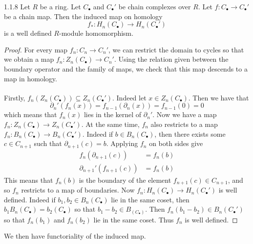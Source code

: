\documentclass[a4paper]{article}
\begin{document}
\begin{lmm}{}{1.1.8} Let $R$ be a ring. Let $C_\bullet$ and $C_\bullet'$ be chain complexes over $R$. Let $f:C_\bullet\to C_\bullet'$ be a chain map. Then the induced map on homology $$f_\ast:H_n(C_\bullet)\to H_n(C_\bullet')$$ is a well defined $R$-module homomorphism. \tcbline
\begin{proof}
For every map $f_n:C_n\to C_n'$, we can restrict the domain to cycles so that we obtain a map $f_n:Z_n(C_\bullet)\to C_n'$. Using the relation given between the boundary operator and the family of maps, we check that this map descends to a map in homology. \\~\\

Firstly, $f_n(Z_n(C_\bullet))\subseteq Z_n(C_\bullet')$. Indeed let $x\in Z_n(C_\bullet)$. Then we have that $$\partial_n'(f_n(x))=f_{n-1}(\partial_n(x))=f_{n-1}(0)=0$$ which means that $f_n(x)$ lies in the kernel of $\partial_n'$. Now we have a map $f_n:Z_n(C_\bullet)\to Z_n(C_\bullet')$. At the same time, $f_n$ also restricts to a map $f_n:B_n(C_\bullet)\to B_n(C_\bullet')$. Indeed if $b\in B_n(C_\bullet)$, then there exists some $c\in C_{n+1}$ such that $\partial_{n+1}(c)=b$. Applying $f_n$ on both sides give 
\begin{align*}
f_n(\partial_{n+1}(c))&=f_n(b)\\
\partial_{n+1}'(f_{n+1}(c))&=f_n(b)
\end{align*}
This means that $f_n(b)$ is the boundary of the element $f_{n+1}(c)\in C_{n+1}$, and so $f_n$ restricts to a map of boundaries. Now $f_n:H_n(C_\bullet)\to H_n(C_\bullet')$ is well defined. Indeed if $b_1,b_2\in B_n(C_\bullet)$ lie in the same coset, then $b_1B_n(C_\bullet)=b_2(C_\bullet)$ so that $b_1-b_2\in B_(C_\bullet)$. Then $f_n(b_1-b_2)\in B_n(C_\bullet')$ so that $f_n(b_1)$ and $f_n(b_2)$ lie in the same coset. Thus $f_n$ is well defined. 
\end{proof}
\end{lmm}

We then have functoriality of the induced map. 
\end{document}
